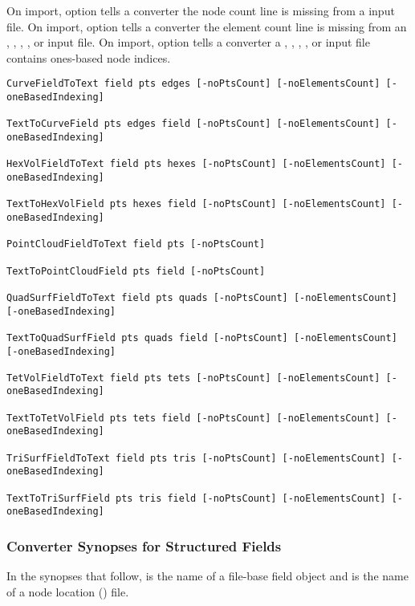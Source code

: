 On import, option  tells a converter the node
count line is missing from a  input file.  On import,
option  tells a converter the element count
line is missing from an , ,
, , or  input file.  On
import, option  tells a converter a
, , , , or
 input file contains ones-based node indices.

\begin{verbatim}
CurveFieldToText field pts edges [-noPtsCount] [-noElementsCount] [-oneBasedIndexing]

TextToCurveField pts edges field [-noPtsCount] [-noElementsCount] [-oneBasedIndexing]

HexVolFieldToText field pts hexes [-noPtsCount] [-noElementsCount] [-oneBasedIndexing]

TextToHexVolField pts hexes field [-noPtsCount] [-noElementsCount] [-oneBasedIndexing]

PointCloudFieldToText field pts [-noPtsCount]

TextToPointCloudField pts field [-noPtsCount]

QuadSurfFieldToText field pts quads [-noPtsCount] [-noElementsCount] [-oneBasedIndexing]

TextToQuadSurfField pts quads field [-noPtsCount] [-noElementsCount] [-oneBasedIndexing]

TetVolFieldToText field pts tets [-noPtsCount] [-noElementsCount] [-oneBasedIndexing]

TextToTetVolField pts tets field [-noPtsCount] [-noElementsCount] [-oneBasedIndexing]

TriSurfFieldToText field pts tris [-noPtsCount] [-noElementsCount] [-oneBasedIndexing]

TextToTriSurfField pts tris field [-noPtsCount] [-noElementsCount] [-oneBasedIndexing]
\end{verbatim}


\subsubsection{Converter Synopses for Structured Fields}
\label{sec:struct_field_synopses}

In the synopses that follow,  is the name of a \sr{}
file-base field object and  is the name of a node location
() file.


